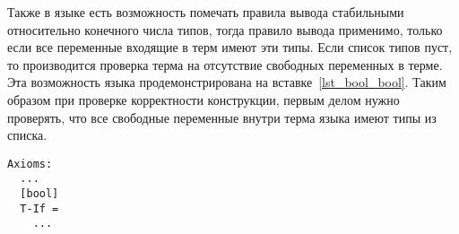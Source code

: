 Также в языке есть возможность помечать правила вывода стабильными относительно конечного числа типов, тогда правило вывода применимо, только если все переменные входящие в терм имеют эти типы. Если список типов пуст, то производится проверка терма на отсутствие свободных переменных в терме. Эта возможность языка продемонстрирована на вставке~\ref{lst_bool_bool}. Таким образом при проверке корректности конструкции, первым делом нужно проверять, что все свободные переменные внутри терма языка имеют типы из списка.

\begin{lstlisting}[label={lst_bool_bool}, caption={Bool-стабильность правила вывода `If', описанная в языке спецификации},captionpos=b, frame=single, float]
Axioms:
  ...
  [bool]
  T-If =
    ...
\end{lstlisting}
